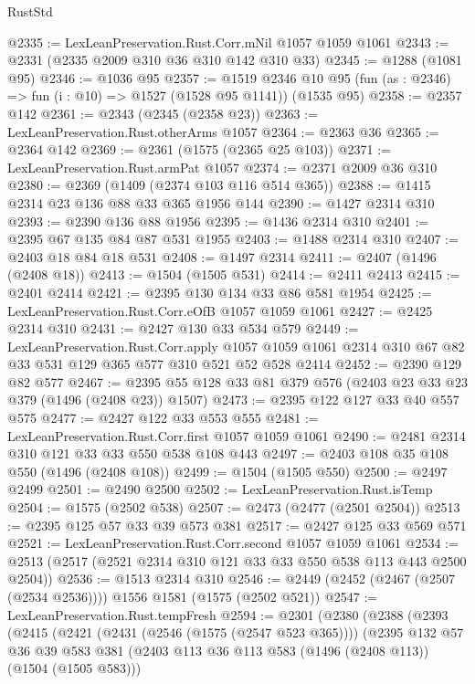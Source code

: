 \begin{lexlean}{RustStd}
\begin{coremodule}
{\begin{coremodule}
{{{{{{{{{{@2335 := LexLeanPreservation.Rust.Corr.mNil @1057 @1059 @1061
@2343 := @2331 (@2335 @2009 @310 @36 @310 @142 @310 @33)
@2345 := @1288 (@1081 @95)
@2346 := @1036 @95
@2357 := @1519
    @2346
    @10
    @95
    (fun (as : @2346) => fun (i : @10) => @1527 (@1528 @95 @1141))
    (@1535 @95)
@2358 := @2357 @142
@2361 := @2343 (@2345 (@2358 @23))
@2363 := LexLeanPreservation.Rust.otherArms @1057
@2364 := @2363 @36
@2365 := @2364 @142
@2369 := @2361 (@1575 (@2365 @25 @103))
@2371 := LexLeanPreservation.Rust.armPat @1057
@2374 := @2371 @2009 @36 @310
@2380 := @2369 (@1409 (@2374 @103 @116 @514 @365))
@2388 := @1415 @2314 @23 @136 @88 @33 @365 @1956 @144
@2390 := @1427 @2314 @310
@2393 := @2390 @136 @88 @1956
@2395 := @1436 @2314 @310
@2401 := @2395 @67 @135 @84 @87 @531 @1955
@2403 := @1488 @2314 @310
@2407 := @2403 @18 @84 @18 @531
@2408 := @1497 @2314
@2411 := @2407 (@1496 (@2408 @18))
@2413 := @1504 (@1505 @531)
@2414 := @2411 @2413
@2415 := @2401 @2414
@2421 := @2395 @130 @134 @33 @86 @581 @1954
@2425 := LexLeanPreservation.Rust.Corr.eOfB @1057 @1059 @1061
@2427 := @2425 @2314 @310
@2431 := @2427 @130 @33 @534 @579
@2449 := LexLeanPreservation.Rust.Corr.apply
    @1057
    @1059
    @1061
    @2314
    @310
    @67
    @82
    @33
    @531
    @129
    @365
    @577
    @310
    @521
    @52
    @528
    @2414
@2452 := @2390 @129 @82 @577
@2467 := @2395 @55 @128 @33 @81 @379 @576 (@2403 @23 @33 @23 @379 (@1496 (@2408 @23)) @1507)
@2473 := @2395 @122 @127 @33 @40 @557 @575
@2477 := @2427 @122 @33 @553 @555
@2481 := LexLeanPreservation.Rust.Corr.first @1057 @1059 @1061
@2490 := @2481 @2314 @310 @121 @33 @33 @550 @538 @108 @443
@2497 := @2403 @108 @35 @108 @550 (@1496 (@2408 @108))
@2499 := @1504 (@1505 @550)
@2500 := @2497 @2499
@2501 := @2490 @2500
@2502 := LexLeanPreservation.Rust.isTemp
@2504 := @1575 (@2502 @538)
@2507 := @2473 (@2477 (@2501 @2504))
@2513 := @2395 @125 @57 @33 @39 @573 @381
@2517 := @2427 @125 @33 @569 @571
@2521 := LexLeanPreservation.Rust.Corr.second @1057 @1059 @1061
@2534 := @2513 (@2517 (@2521 @2314 @310 @121 @33 @33 @550 @538 @113 @443 @2500 @2504))
@2536 := @1513 @2314 @310
@2546 := @2449 (@2452 (@2467 (@2507 (@2534 @2536)))) @1556 @1581 (@1575 (@2502 @521))
@2547 := LexLeanPreservation.Rust.tempFresh
@2594 := @2301
    (@2380
      (@2388
        (@2393
          (@2415
            (@2421
              (@2431 (@2546 (@1575 (@2547 @523 @365))))
              (@2395
                @132
                @57
                @36
                @39
                @583
                @381
                (@2403 @113 @36 @113 @583 (@1496 (@2408 @113)) (@1504 (@1505 @583)))
}}}}}}}}}}
\end{coremodule}}
\end{coremodule}
\end{lexlean}

